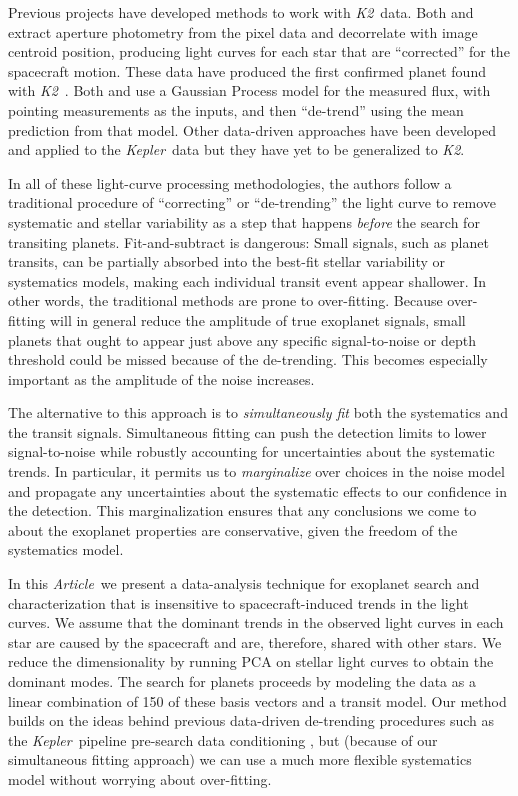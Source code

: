 \documentclass[12pt,preprint]{aastex}
\newcommand{\project}[1]{\textsl{#1}} %
\newcommand{\kepler}{\project{Kepler}}
\newcommand{\KT}{\project{K2}}
\newcommand{\pdc}{\project{PDC}}
\newcommand{\paper}{\textsl{Article}}
\begin{document}
Previous projects have developed methods to work with \KT\ data.
Both \citet{Vanderburg:2014} and \citet{Armstrong:2014}
extract aperture photometry from the pixel data
and decorrelate with image centroid position, producing light curves for each
star that are ``corrected'' for the spacecraft motion.
These data have produced the first confirmed planet found with
\KT\ \citep{Vanderburg:2015}.
Both \citet{Aigrain:2015} and \citet{Crossfield:2015} use a Gaussian Process
model for the measured flux, with pointing measurements as the inputs, and
then ``de-trend'' using the mean prediction from that model.
Other data-driven approaches have been developed and applied to the \kepler\
data \citep[for example,][]{pdc1, pdc2, arc, dun} but they have yet to be
generalized to \KT.

In all of these light-curve processing methodologies, the authors follow a
traditional procedure of ``correcting'' or ``de-trending'' the light curve to
remove systematic and stellar variability as a step that happens \emph{before}
the search for transiting planets.
Fit-and-subtract is dangerous:
Small signals, such as planet transits, can be
partially absorbed into the best-fit stellar variability or systematics
models, making each individual transit event appear shallower.
In other words, the traditional methods are prone to over-fitting.
Because over-fitting will in general reduce the amplitude of true exoplanet
signals, small planets that ought to appear just above any specific
signal-to-noise or depth threshold could be missed because of the de-trending.
This becomes especially important as the amplitude of the noise increases.

The alternative to this approach is to \emph{simultaneously fit} both the systematics
and the transit signals.
Simultaneous fitting can push the detection limits to lower signal-to-noise while
robustly accounting for uncertainties about the systematic trends.
In particular, it permits us to \emph{marginalize} over choices in the noise
model and propagate any uncertainties about the systematic effects
to our confidence in the detection.
This marginalization ensures that any conclusions we come to about the exoplanet
properties are conservative, given the freedom of the systematics model.

In this \paper\ we present a data-analysis technique for exoplanet search and
characterization that is insensitive to spacecraft-induced trends in the light
curves.
We assume that the dominant trends in the observed light curves in each star
are caused by the spacecraft and are, therefore, shared with other stars.
We reduce the dimensionality by running PCA on stellar light curves to obtain
the dominant modes.
The search for planets proceeds by modeling the data as a linear combination of
150 of these basis vectors and a transit model.
Our method builds on the ideas behind previous data-driven de-trending
procedures such as the \kepler\ pipeline pre-search data conditioning
\citep[\pdc;][]{pdc1, pdc2}, but (because of our simultaneous fitting
approach) we can use a much more flexible systematics model without worrying
about over-fitting.
\end{document}
